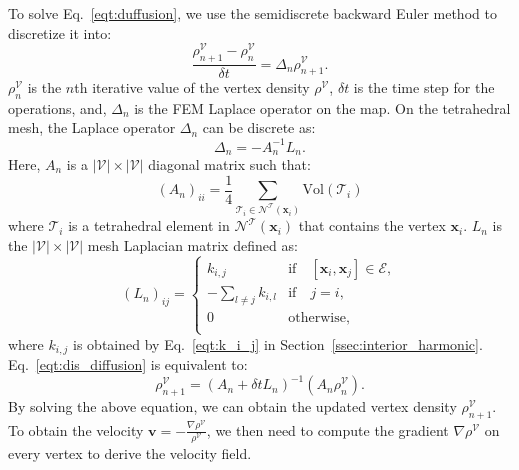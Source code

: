 \documentclass{article}
\begin{document}
To solve Eq.~\eqref{eqt:duffusion}, we use the semidiscrete backward Euler method to discretize it into:
\begin{equation}\label{eqt:dis_diffusion}
    \frac{\rho^{\mathcal{V}}_{n+1} - \rho^{\mathcal{V}}_{n}}{\delta t} = \Delta_{n}\rho^{\mathcal{V}}_{n+1}.
\end{equation}
$\rho^{\mathcal{V}}_{n}$ is the $n$th iterative value of the vertex density $\rho^{\mathcal{V}}$, $\delta t$ is the time step for the operations, and, $\Delta_{n}$ is the FEM Laplace operator on the map. On the tetrahedral mesh, the Laplace operator $\Delta_{n}$ can be discrete as:
\begin{equation}
    \Delta_n = -A^{-1}_nL_n.
\end{equation}
Here, $A_n$ is a $|\mathcal{V}| \times |\mathcal{V}|$ diagonal matrix such that:
\begin{equation}\label{eqt:A_n}
    \left(A_n\right)_{ii} = \frac{1}{4} \sum_{\mathcal{T}_i \in \mathcal{N}^{\mathcal{T}}(\mathbf{x}_i)} \text{Vol}\left( \mathcal{T}_i \right)
\end{equation}
where $\mathcal{T}_i$ is a tetrahedral element in $\mathcal{N}^{\mathcal{T}}(\mathbf{x}_i)$ that contains the vertex $\mathbf{x}_i$. $L_n$ is the $|\mathcal{V}| \times |\mathcal{V}|$ mesh Laplacian matrix defined as:
\begin{equation}\label{eqt:L_n}
    \left(L_n\right)_{ij} = 
      \left \{
    \begin{array}{ll}
     k_{i,j}    & \text{if} \quad \left[\mathbf{x}_i,\mathbf{x}_j \right] \in \mathcal{E}, \\
     -\sum_{l\neq j} k_{i,l}    & \text{if} \quad j = i, \\
     0      & \text{otherwise}, \\
    \end{array}  
    \right.
\end{equation}
where $k_{i,j}$ is obtained by Eq.~\eqref{eqt:k_i_j} in Section~\ref{ssec:interior_harmonic}. Eq.~\eqref{eqt:dis_diffusion} is equivalent to:
\begin{equation}\label{eqt:diffusion_discrete}
    \rho^{\mathcal{V}}_{n+1} = \left(A_n + \delta t L_n \right)^{-1} \left( A_n \rho^{\mathcal{V}}_{n} \right).
\end{equation}
By solving the above equation, we can obtain the updated vertex density $\rho^{\mathcal{V}}_{n+1}$. To obtain the velocity $\mathbf{v} =-\frac{\nabla \rho^{\mathcal{V}}}{\rho^{\mathcal{V}}}$, we then need to compute the gradient $\nabla \rho^{\mathcal{V}}$ on every vertex to derive the velocity field. 
\end{document}
